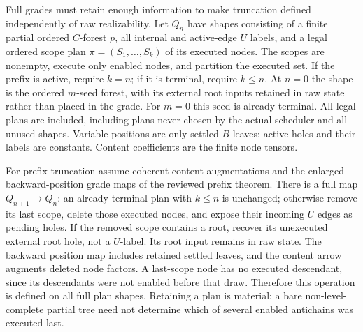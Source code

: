 \documentclass[11pt]{article}
\begin{document}
Full grades must retain enough information to make truncation defined independently of raw realizability. Let $Q_n$ have shapes consisting of a finite partial ordered $C$-forest $p$, all internal and active-edge $U$ labels, and a legal ordered scope plan $\pi=(S_1,\ldots,S_k)$ of its executed nodes. The scopes are nonempty, execute only enabled nodes, and partition the executed set. If the prefix is active, require $k=n$; if it is terminal, require $k\leq n$. At $n=0$ the shape is the ordered $m$-seed forest, with its external root inputs retained in raw state rather than placed in the grade. For $m=0$ this seed is already terminal. All legal plans are included, including plans never chosen by the actual scheduler and all unused shapes. Variable positions are only settled $B$ leaves; active holes and their labels are constants. Content coefficients are the finite node tensors.

For prefix truncation assume coherent content augmentations and the enlarged backward-position grade maps of the reviewed prefix theorem. There is a full map $Q_{n+1}\to Q_n$: an already terminal plan with $k\leq n$ is unchanged; otherwise remove its last scope, delete those executed nodes, and expose their incoming $U$ edges as pending holes. If the removed scope contains a root, recover its unexecuted external root hole, not a $U$-label. Its root input remains in raw state. The backward position map includes retained settled leaves, and the content arrow augments deleted node factors. A last-scope node has no executed descendant, since its descendants were not enabled before that draw. Therefore this operation is defined on all full plan shapes. Retaining a plan is material: a bare non-level-complete partial tree need not determine which of several enabled antichains was executed last.
\end{document}
